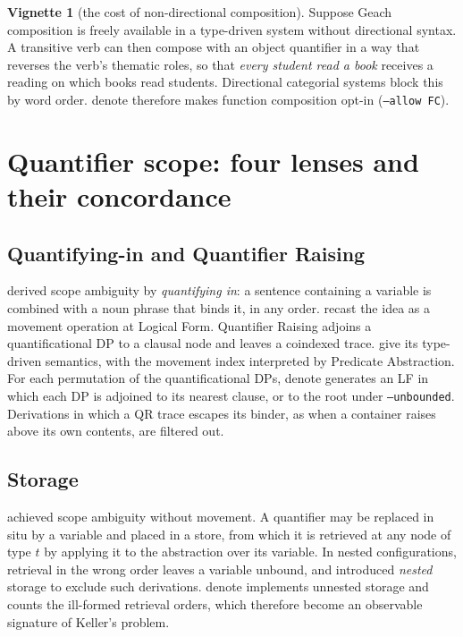 \documentclass[11pt,a4paper]{article}
\newcommand{\dn}{\textsf{denote}}
\theoremstyle{definition}
\newtheorem{vignette}{Vignette}
\begin{document}
\begin{vignette}[the cost of non-directional composition]\label{v:fc}
Suppose Geach composition is freely available in a type-driven system without directional syntax. A transitive verb can then compose with an object quantifier in a way that reverses the verb's thematic roles, so that \textit{every student read a book} receives a reading on which books read students. Directional categorial systems \citep{lambek1958,steedman2000,jacobson1999} block this by word order. \dn{} therefore makes function composition opt-in (\texttt{--allow FC}).
\end{vignette}

\section{Quantifier scope: four lenses and their concordance}\label{sec:scope}

\subsection{Quantifying-in and Quantifier Raising}
\citet{montague1973} derived scope ambiguity by \emph{quantifying in}: a sentence containing a variable is combined with a noun phrase that binds it, in any order. \citet{may1977,may1985} recast the idea as a movement operation at Logical Form. Quantifier Raising adjoins a quantificational DP to a clausal node and leaves a coindexed trace. \citet[chs.~7--8]{heimkratzer1998} give its type-driven semantics, with the movement index interpreted by Predicate Abstraction. For each permutation of the quantificational DPs, \dn{} generates an LF in which each DP is adjoined to its nearest clause, or to the root under \texttt{--unbounded}. Derivations in which a QR trace escapes its binder, as when a container raises above its own contents, are filtered out.

\subsection{Storage}
\citet{cooper1983} achieved scope ambiguity without movement. A quantifier may be replaced in situ by a variable and placed in a store, from which it is retrieved at any node of type $t$ by applying it to the abstraction over its variable. In nested configurations, retrieval in the wrong order leaves a variable unbound, and \citet{keller1988} introduced \emph{nested} storage to exclude such derivations. \dn{} implements unnested storage and counts the ill-formed retrieval orders, which therefore become an observable signature of Keller's problem.
\end{document}
